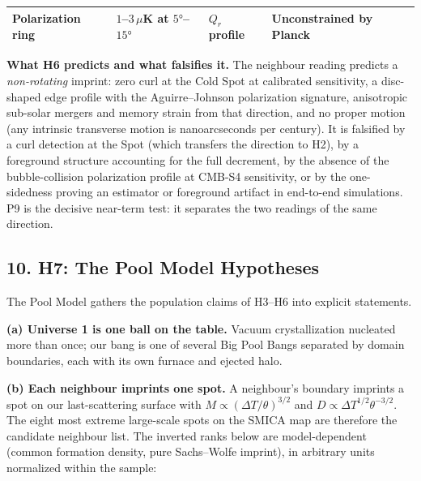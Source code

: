 \documentclass[
]{article}
\begin{document}
\begin{longtable}[]{@{}llll@{}}
\begin{minipage}[t]{0.22\columnwidth}
Polarization ring\strut
\end{minipage} & \begin{minipage}[t]{0.22\columnwidth}\raggedright
\(1\)--\(3\,\mu\)K at \(5°\)--\(15°\)\strut
\end{minipage} & \begin{minipage}[t]{0.22\columnwidth}\raggedright
\(Q_r\) profile\strut
\end{minipage} & \begin{minipage}[t]{0.22\columnwidth}\raggedright
Unconstrained by Planck\strut
\end{minipage}\tabularnewline
\bottomrule
\end{longtable}

\textbf{What H6 predicts and what falsifies it.} The neighbour reading
predicts a \emph{non-rotating} imprint: zero curl at the Cold Spot at
calibrated sensitivity, a disc-shaped edge profile with the
Aguirre--Johnson polarization signature, anisotropic sub-solar mergers
and memory strain from that direction, and no proper motion (any
intrinsic transverse motion is nanoarcseconds per century). It is
falsified by a curl detection at the Spot (which transfers the direction
to H2), by a foreground structure accounting for the full decrement, by
the absence of the bubble-collision polarization profile at CMB-S4
sensitivity, or by the one-sidedness proving an estimator or foreground
artifact in end-to-end simulations. P9 is the decisive near-term test:
it separates the two readings of the same direction.

\hypertarget{h7-the-pool-model-hypotheses}{%
\subsection{\texorpdfstring{\textbf{10. H7: The Pool Model
Hypotheses}}{10. H7: The Pool Model Hypotheses}}\label{h7-the-pool-model-hypotheses}}

The Pool Model gathers the population claims of H3--H6 into explicit
statements.

\textbf{(a) Universe 1 is one ball on the table.} Vacuum crystallization
nucleated more than once; our bang is one of several Big Pool Bangs
separated by domain boundaries, each with its own furnace and ejected
halo.

\textbf{(b) Each neighbour imprints one spot.} A neighbour's boundary
imprints a spot on our last-scattering surface with
\(M \propto (\Delta T/\theta)^{3/2}\) and
\(D \propto \Delta T^{1/2}\theta^{-3/2}\). The eight most extreme
large-scale spots on the SMICA map are therefore the candidate neighbour
list. The inverted ranks below are model-dependent (common formation
density, pure Sachs--Wolfe imprint), in arbitrary units normalized
within the sample:
\end{document}
